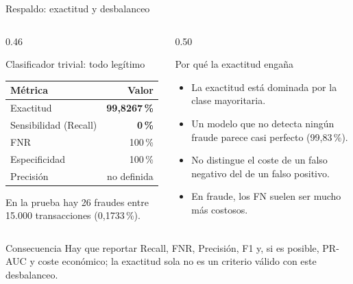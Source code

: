 \documentclass[aspectratio=169,11pt]{beamer}
\begin{document}
\begin{frame}{Respaldo: exactitud y desbalanceo}
  \begin{columns}[T]
    \begin{column}{0.46\textwidth}
      \begin{block}{Clasificador trivial: todo legítimo}
        \scriptsize
        \begin{tabular}{@{}lr@{}}
          \toprule
          Métrica & Valor \\
          \midrule
          Exactitud & \textbf{99,8267\,\%} \\
          Sensibilidad (Recall) & \textbf{0\,\%} \\
          FNR & 100\,\% \\
          Especificidad & 100\,\% \\
          Precisión & no definida \\
          \bottomrule
        \end{tabular}
      \end{block}
      \vspace{0.1cm}
      {\scriptsize En la prueba hay 26 fraudes entre 15.000
      transacciones (0,1733\,\%).}
    \end{column}
    \begin{column}{0.50\textwidth}
      \begin{block}{Por qué la exactitud engaña}
        \scriptsize
        \begin{itemize}
          \item La exactitud está dominada por la clase mayoritaria.
          \item Un modelo que no detecta ningún fraude parece casi
                perfecto (99,83\,\%).
          \item No distingue el coste de un falso negativo del de un
                falso positivo.
          \item En fraude, los FN suelen ser mucho más costosos.
        \end{itemize}
      \end{block}
    \end{column}
  \end{columns}
  \vspace{0.15cm}
  \begin{alertblock}{Consecuencia}
    \small
    Hay que reportar Recall, FNR, Precisión, F1 y, si es posible,
    PR-AUC y coste económico; la exactitud sola no es un criterio
    válido con este desbalanceo.
  \end{alertblock}
\end{frame}
\end{document}
